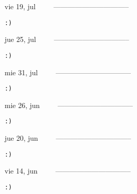 \documentclass[letterpaper,10pt]{article}
\begin{document}
\begin{multicols}{3}
{vie 19, jul\ \ \ \ \ --------------------------------}
\begin{flushright}\begin{small}\texttt{:)}\end{small}\end{flushright}
\vfill
{jue 25, jul\ \ \ \ \ --------------------------------}
\begin{flushright}\begin{small}\texttt{:)}\end{small}\end{flushright}\par
\vfill
{mie 31, jul\ \ \ \ \ --------------------------------}
\begin{flushright}\begin{small}\texttt{:)}\end{small}\end{flushright}\par
\vfill
\end{multicols}
\vspace{1.05cm}

\begin{multicols}{3}
{mie 26, jun\ \ \ \ \ --------------------------------}
\begin{flushright}\begin{small}\texttt{:)}\end{small}\end{flushright}
\vfill
{jue 20, jun\ \ \ \ \ --------------------------------}
\begin{flushright}\begin{small}\texttt{:)}\end{small}\end{flushright}\par
\vfill
{vie 14, jun\ \ \ \ \ --------------------------------}
\begin{flushright}\begin{small}\texttt{:)}\end{small}\end{flushright}\par
\vfill
\end{multicols}
\vspace{1.05cm}
\end{document}
